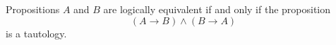 

\setcounter{section}{1}
\setcounter{subsection}{3}
\setcounter{dfn}{10}

\begin{thm}
Propositions $A$ and $B$ are logically equivalent if and only if the proposition
\[
(A \to B) \wedge (B \to A)
\]
is a tautology.
\end{thm}

